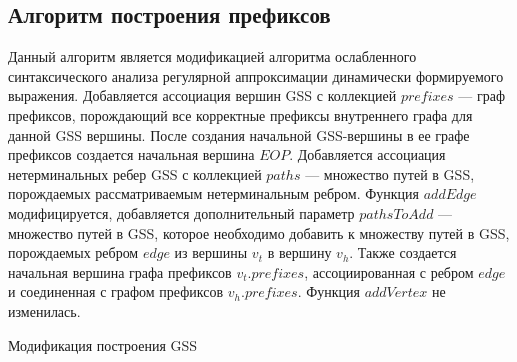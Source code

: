 \subsection{Алгоритм построения префиксов}
Данный алгоритм является модификацией алгоритма ослабленного синтаксического анализа регулярной аппроксимации динамически формируемого выражения. Добавляется ассоциация вершин GSS с коллекцией $prefixes$ --- граф префиксов, порождающий все корректные префиксы внутреннего графа для данной GSS вершины. После создания начальной GSS-вершины в ее графе префиксов создается начальная вершина $EOP$. Добавляется ассоциация нетерминальных ребер GSS с коллекцией $paths$ --- множество путей в GSS, порождаемых рассматриваемым нетерминальным ребром. Функция $addEdge$ модифицируется, добавляется дополнительный параметр $pathsToAdd$ --- множество путей в GSS, которое необходимо добавить к множеству путей в GSS, порождаемых ребром $edge$ из вершины $v_{t}$ в вершину $v_{h}$. Также создается начальная вершина графа префиксов $v_{t}.prefixes$, ассоциированная с ребром $edge$ и соединенная с графом префиксов $v_{h}.prefixes$. Функция $addVertex$ не изменилась.

\begin{algorithm}[H]
\begin{algorithmic}[1]
\caption{Модификация построения GSS}
\label{addEdge_mod}

    \EndIf
      \EndFor
    \EndIf
  \EndIf
  \EndIf
\EndFunction
\end{algorithmic}
\end{algorithm}

